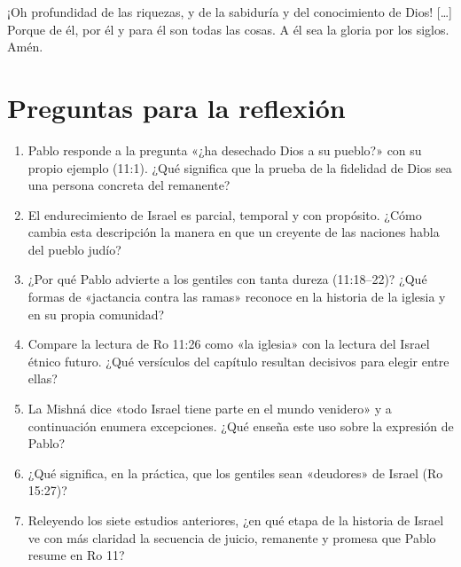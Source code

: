 \begin{cita}¡Oh profundidad de las riquezas, y de la sabiduría y del conocimiento de Dios! [\ldots] Porque de él, por él y para él son todas las cosas. A él sea la gloria por los siglos. Amén.\end{cita}

\section*{Preguntas para la reflexión}
\begin{enumerate}
\item Pablo responde a la pregunta «¿ha desechado Dios a su pueblo?» con su propio ejemplo (11:1). ¿Qué significa que la prueba de la fidelidad de Dios sea una persona concreta del remanente?
\item El endurecimiento de Israel es parcial, temporal y con propósito. ¿Cómo cambia esta descripción la manera en que un creyente de las naciones habla del pueblo judío?
\item ¿Por qué Pablo advierte a los gentiles con tanta dureza (11:18--22)? ¿Qué formas de «jactancia contra las ramas» reconoce en la historia de la iglesia y en su propia comunidad?
\item Compare la lectura de Ro 11:26 como «la iglesia» con la lectura del Israel étnico futuro. ¿Qué versículos del capítulo resultan decisivos para elegir entre ellas?
\item La Mishná dice «todo Israel tiene parte en el mundo venidero» y a continuación enumera excepciones. ¿Qué enseña este uso sobre la expresión de Pablo?
\item ¿Qué significa, en la práctica, que los gentiles sean «deudores» de Israel (Ro 15:27)?
\item Releyendo los siete estudios anteriores, ¿en qué etapa de la historia de Israel ve con más claridad la secuencia de juicio, remanente y promesa que Pablo resume en Ro 11?
\end{enumerate}

